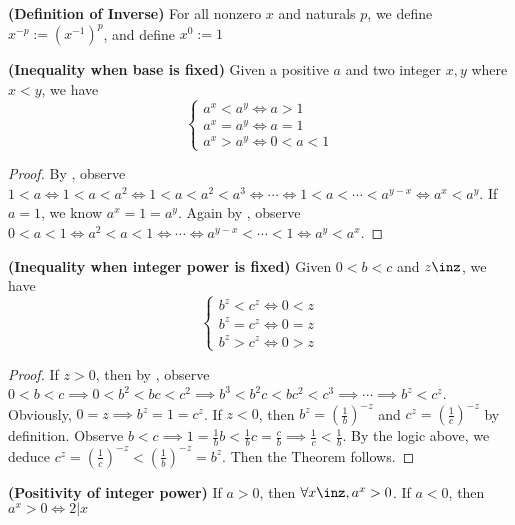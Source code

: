 \documentclass{report}
\begin{document}
\begin{definition}
\label{1.2.8}
\textbf{(Definition of Inverse)} For all nonzero $x$ and naturals $p$, we define $x^{-p}:=(x^{-1})^p$, and define $x^0:=1$ 
\end{definition}
\begin{theorem}
\label{1.2.9}
  
\textbf{(Inequality when base is fixed)} Given a positive $a$ and two integer  $x,y$ where  $x<y$, we have
\begin{equation*}
\begin{cases}
  a^x<a^y\iff a>1\\
  a^x=a^y \iff a=1 \\
  a^x>a^y \iff 0<a<1  
\end{cases}
\end{equation*}
\end{theorem}
\begin{proof}
By , observe $1<a\iff  1<a<a^2\iff   1<a<a^2<a^3\iff  \cdots  \iff  1<a<\cdots <a^{y-x}\iff  a^x<a^y$. If $a=1$, we know  $a^x=1=a^y$. Again by , observe $0<a<1\iff  a^2<a<1\iff  \cdots \iff  a^{y-x}<\cdots <1\iff  a^{y}<a^{x}$. 
\end{proof}
\begin{theorem}
\label{1.2.10}
\textbf{(Inequality when integer power is fixed)} Given $0<b<c$ and  $z\inz$, we have 
\begin{equation*}
\begin{cases}
  b^z<c^z \iff 0<z\\
  b^z=c^z \iff 0=z\\
  b^z>c^z\iff 0>z
\end{cases}
\end{equation*}
\end{theorem}
\begin{proof}
  If $z>0$, then by , observe $0<b<c\implies 0<b^2<bc<c^2\implies b^3<b^2c<bc^2<c^3\implies \cdots \implies b^z<c^z $. Obviously, $0=z\implies b^z=1=c^z$. If $z<0$, then $b^z=(\frac{1}{b})^{-z}$ and $c^z=(\frac{1}{c})^{-z}$ by definition. Observe $b<c\implies 1=\frac{1}{b}b<\frac{1}{b}c=\frac{c}{b}\implies \frac{1}{c}<\frac{1}{b}$. By the logic above, we deduce $c^z=(\frac{1}{c})^{-z}<(\frac{1}{b})^{-z}=b^z$. Then the Theorem follows. 
\end{proof}
\begin{theorem}
\label{1.2.11}
\textbf{(Positivity of integer power)} If $a>0$, then $\forall x\inz,a^x>0$. If  $a<0$, then  $a^x>0\iff 2|x$
\end{theorem}
\end{document}
